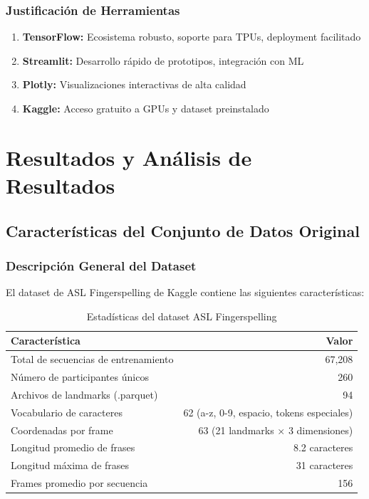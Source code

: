 \documentclass[12pt,a4paper]{article}
\begin{document}
\subsubsection{Justificación de Herramientas}
\begin{enumerate}
    \item \textbf{TensorFlow:} Ecosistema robusto, soporte para TPUs, deployment facilitado
    \item \textbf{Streamlit:} Desarrollo rápido de prototipos, integración con ML
    \item \textbf{Plotly:} Visualizaciones interactivas de alta calidad
    \item \textbf{Kaggle:} Acceso gratuito a GPUs y dataset preinstalado
\end{enumerate}

\section{Resultados y Análisis de Resultados}

\subsection{Características del Conjunto de Datos Original}

\subsubsection{Descripción General del Dataset}
El dataset de ASL Fingerspelling de Kaggle contiene las siguientes características:

\begin{table}[H]
\centering
\begin{tabular}{|l|r|}
\hline
\textbf{Característica} & \textbf{Valor} \\
\hline
Total de secuencias de entrenamiento & 67,208 \\
\hline
Número de participantes únicos & 260 \\
\hline
Archivos de landmarks (.parquet) & 94 \\
\hline
Vocabulario de caracteres & 62 (a-z, 0-9, espacio, tokens especiales) \\
\hline
Coordenadas por frame & 63 (21 landmarks × 3 dimensiones) \\
\hline
Longitud promedio de frases & 8.2 caracteres \\
\hline
Longitud máxima de frases & 31 caracteres \\
\hline
Frames promedio por secuencia & 156 \\
\hline
\end{tabular}
\caption{Estadísticas del dataset ASL Fingerspelling}
\end{table}
\end{document}
